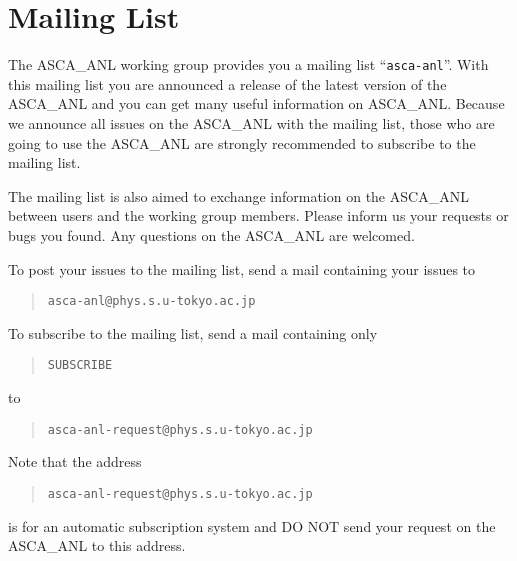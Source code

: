 \section*{Mailing List}
The ASCA\_ANL working group provides you
a mailing list ``{\tt asca-anl}''.
With this mailing list
you are announced a release of the latest version of the ASCA\_ANL
and you can get many useful information on ASCA\_ANL.
Because
we announce all issues on the ASCA\_ANL with the mailing list,
those who are going to use the ASCA\_ANL
are strongly recommended to subscribe to the mailing list.

The mailing list is also aimed
to exchange information on the ASCA\_ANL
between  users and the working group members.
Please inform us your requests or bugs you found.
Any questions on the ASCA\_ANL are welcomed.

To post your issues to the mailing list,
send a mail containing your issues to
\begin{quote}
   {\tt asca-anl@phys.s.u-tokyo.ac.jp}
\end{quote}

To subscribe to the mailing list,
send a mail containing only
\begin{quote}
   {\tt SUBSCRIBE}
\end{quote}
to
\begin{quote}
   {\tt asca-anl-request@phys.s.u-tokyo.ac.jp}
\end{quote}
Note that the address
\begin{quote}
   {\tt asca-anl-request@phys.s.u-tokyo.ac.jp}
\end{quote}
is for an automatic subscription system
and DO NOT send your request on the ASCA\_ANL to this address.
